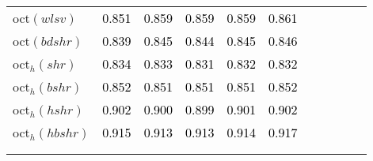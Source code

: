 \begin{tabular}[t]{l|>{}cccc>{}c|ccccc}
oct$(wlsv)$ & \textcolor{black}{0.851} & \textcolor{black}{0.859} & \textcolor{black}{0.859} & \textcolor{black}{0.859} & \textcolor{black}{0.861} &  &  &  &  & \\
oct$(bdshr)$ & \textcolor{black}{0.839} & \textcolor{black}{0.845} & \textcolor{black}{0.844} & \textcolor{black}{0.845} & \textcolor{black}{0.846} &  &  &  &  & \\
oct$_h(shr)$ & \textcolor{black}{0.834} & \textcolor{black}{0.833} & \textcolor{black}{0.831} & \textcolor{black}{0.832} & \textcolor{black}{0.832} &  &  &  &  & \\
oct$_h(bshr)$ & \textcolor{black}{0.852} & \textcolor{black}{0.851} & \textcolor{black}{0.851} & \textcolor{black}{0.851} & \textcolor{black}{0.852} &  &  &  &  & \\
oct$_h(hshr)$ & \textcolor{black}{0.902} & \textcolor{black}{0.900} & \textcolor{black}{0.899} & \textcolor{black}{0.901} & \textcolor{black}{0.902} &  &  &  &  & \\
oct$_h(hbshr)$ & \textcolor{black}{0.915} & \textcolor{black}{0.913} & \textcolor{black}{0.913} & \textcolor{black}{0.914} & \textcolor{black}{0.917} &  &  &  &  & \\[-1.5ex]
\hline\\[-1.5ex]
\bottomrule
{}\\
\end{tabular}
